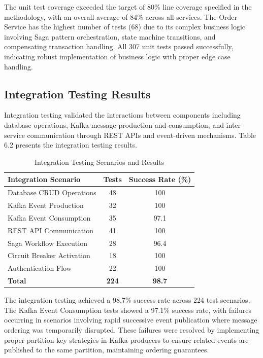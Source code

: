 The unit test coverage exceeded the target of 80\% line coverage specified in the methodology, with an overall average of 84\% across all services. The Order Service has the highest number of tests (68) due to its complex business logic involving Saga pattern orchestration, state machine transitions, and compensating transaction handling. All 307 unit tests passed successfully, indicating robust implementation of business logic with proper edge case handling.

\subsection{Integration Testing Results}

Integration testing validated the interactions between components including database operations, Kafka message production and consumption, and inter-service communication through REST APIs and event-driven mechanisms. Table 6.2 presents the integration testing results.

\begin{table}[h]
\centering
\caption{Integration Testing Scenarios and Results}
\begin{tabular}{|l|c|c|}
\hline
\textbf{Integration Scenario} & \textbf{Tests} & \textbf{Success Rate (\%)} \\
\hline
Database CRUD Operations & 48 & 100 \\
Kafka Event Production & 32 & 100 \\
Kafka Event Consumption & 35 & 97.1 \\
REST API Communication & 41 & 100 \\
Saga Workflow Execution & 28 & 96.4 \\
Circuit Breaker Activation & 18 & 100 \\
Authentication Flow & 22 & 100 \\
\hline
\textbf{Total} & \textbf{224} & \textbf{98.7} \\
\hline
\end{tabular}
\end{table}

The integration testing achieved a 98.7\% success rate across 224 test scenarios. The Kafka Event Consumption tests showed a 97.1\% success rate, with failures occurring in scenarios involving rapid successive event publication where message ordering was temporarily disrupted. These failures were resolved by implementing proper partition key strategies in Kafka producers to ensure related events are published to the same partition, maintaining ordering guarantees.

